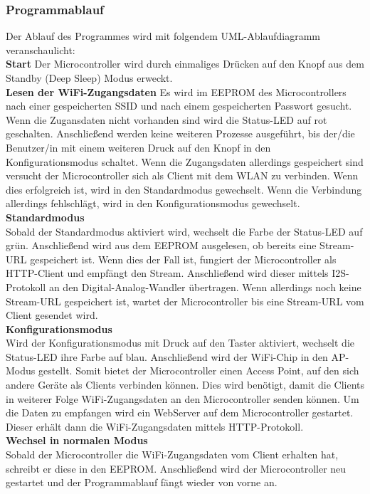 \documentclass[]{article}
\begin{document}
\subsubsection{Programmablauf}
Der Ablauf des Programmes wird mit folgendem UML-Ablaufdiagramm veranschaulicht: \newline \\
\textbf{Start} \newline
Der Microcontroller wird durch einmaliges Drücken auf den Knopf aus dem Standby (Deep Sleep) Modus erweckt. \newline \\
\textbf{Lesen der WiFi-Zugangsdaten} \newline
Es wird im EEPROM des Microcontrollers nach einer gespeicherten SSID und nach einem gespeicherten Passwort gesucht. Wenn die Zugansdaten nicht vorhanden sind wird die Status-LED auf rot geschalten. Anschließend werden keine weiteren Prozesse ausgeführt, bis der/die Benutzer/in mit einem weiteren Druck auf den Knopf in den Konfigurationsmodus schaltet. Wenn die Zugangsdaten allerdings gespeichert sind versucht der Microcontroller sich als Client mit dem WLAN zu verbinden. Wenn dies erfolgreich ist, wird in den Standardmodus gewechselt. Wenn die Verbindung allerdings fehlschlägt, wird in den Konfigurationsmodus gewechselt. \newline \\
\textbf{Standardmodus} \\
Sobald der Standardmodus aktiviert wird, wechselt die Farbe der Status-LED auf grün. Anschließend wird aus dem EEPROM ausgelesen, ob bereits eine Stream-URL gespeichert ist. Wenn dies der Fall ist, fungiert der Microcontroller als HTTP-Client und empfängt den Stream. Anschließend wird dieser mittels I2S-Protokoll an den Digital-Analog-Wandler übertragen. Wenn allerdings noch keine Stream-URL gespeichert ist, wartet der Microcontroller bis eine Stream-URL vom Client gesendet wird. \newline \\
\textbf{Konfigurationsmodus} \\
Wird der Konfigurationsmodus mit Druck auf den Taster aktiviert, wechselt die Status-LED ihre Farbe auf blau. Anschließend wird der WiFi-Chip in den AP-Modus gestellt. Somit bietet der Microcontroller einen Access Point, auf den sich andere Geräte als Clients verbinden können. Dies wird benötigt, damit die Clients in weiterer Folge WiFi-Zugangsdaten an den Microcontroller senden können. Um die Daten zu empfangen wird ein WebServer auf dem Microcontroller gestartet. Dieser erhält dann die WiFi-Zugangsdaten mittels HTTP-Protokoll. \newline \\
\textbf{Wechsel in normalen Modus} \\
Sobald der Microcontroller die WiFi-Zugangsdaten vom Client erhalten hat, schreibt er diese in den EEPROM. Anschließend wird der Microcontroller neu gestartet und der Programmablauf fängt wieder von vorne an.
\end{document}
